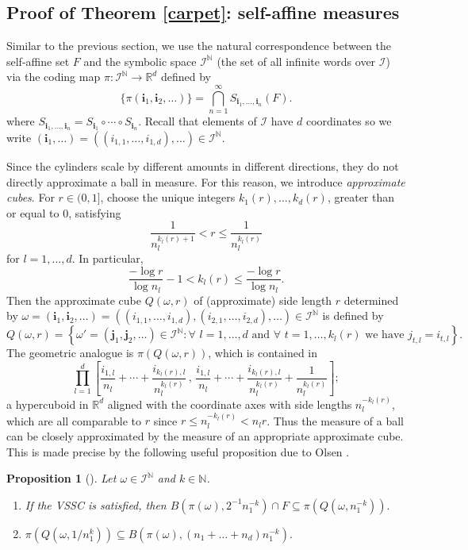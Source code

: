 \documentclass[12pt]{amsart}
\numberwithin{equation}{section}
\newtheorem{prop}[thm]{Proposition}
\renewcommand{\leq}{\leqslant}
\begin{document}
\subsection{Proof of Theorem \ref{carpet}: self-affine measures} \label{self-affine}



Similar to the previous section, we use the natural correspondence between the self-affine set $F$ and the symbolic space $\mathcal{I}^{\mathbb{N}}$ (the set of all infinite words over $\mathcal{I}$) via the coding map $\pi \colon \mathcal{I}^{\mathbb{N}} \rightarrow \mathbb{R}^d$ defined by 
\[
\{\pi(\textbf{i}_1, \textbf{i}_2, \ldots)\}=  \bigcap_{n=1}^\infty S_{\textbf{i}_1,\ldots, \textbf{i}_n}(F).
\]
where $ S_{\textbf{i}_1,\ldots, \textbf{i}_n} =  S_{\textbf{i}_1} \circ \cdots \circ S_{\textbf{i}_n}$.  Recall that elements of $\mathcal{I}$ have $d$ coordinates so we write $(\mathbf{i}_1,\ldots) = ((i_{1,1},\ldots, i_{1,d}),\ldots) \in \mathcal{I}^{\mathbb{N}} $.

Since the cylinders scale by different amounts in different directions, they do not directly approximate a ball in measure.  For this reason, we introduce \emph{approximate cubes}. For $r\in (0,1]$, choose the unique integers $k_1(r),\ldots,k_d(r)$, greater than or equal to 0, satisfying
\[
\frac{1}{n_l^{k_l(r)+1}}< r \leq \frac{1}{n_l^{k_l(r)}}
\]
for $l=1,\ldots,d$. In particular, 
\[
 \frac{-\log r}{\log n_l}-1 < k_l(r) \leq \frac{-\log r}{\log n_l}.
\]
Then the approximate cube $Q(\omega, r)$ of (approximate) side length $r$ determined by $\omega =\left( \textbf{i}_1, \textbf{i}_2 , \ldots \right) =\left( (i_{1,1}, \dots, i_{1,d}), (i_{2,1}, \dots, i_{2,d}) , \ldots \right)    \in \mathcal{I}^{\mathbb{N}}$ is defined by
\[
Q(\omega, r)=\left\{ \omega'=\left( \textbf{j}_1, \textbf{j}_2 , \ldots \right)\in \mathcal{I}^{\mathbb{N}} : \forall \, \,  l=1, \ldots, d \text{ and } \forall\, \, t= 1, \ldots, k_l(r) \text{ we have } j_{t,l}=i_{t,l} \right\}.
\]
The geometric analogue is $\pi\left(Q(\omega, r)\right)$, which is contained in
\[ 
\prod_{l=1}^d \left[\frac{i_{1,l}}{n_l}+\cdots+\frac{i_{k_l(r),l}}{n_l^{k_l(r)}} \, , \, \frac{i_{1,l}}{n_l}+\cdots+\frac{i_{k_l(r),l}}{n_l^{k_l(r)}}+\frac{1}{n_l^{k_l(r)}} \right];
\]
a hypercuboid in $\mathbb{R}^d$ aligned with the coordinate axes with side lengths $n_l^{-k_l(r)}$, which are all comparable to $r$ since $ r \leq n_l^{-k_l(r)} < n_l r$.  Thus the measure of a ball can be closely approximated by the measure of an appropriate approximate cube.  This is made precise by the following   useful proposition due to Olsen \cite[Proposition 6.2.1]{sponges}.
\begin{prop}[\cite{sponges}] \label{ballscubes}
Let $\omega \in \mathcal{I}^{\mathbb{N}}$ and $k \in \mathbb{N}$.
\begin{enumerate} 
\item If the VSSC is satisfied, then $B\left( \pi(\omega), 2^{-1}n_1^{-k}\right)\cap F \subseteq \pi \left(Q\left( \omega, n_1^{-k} \right) \right).$ 
\item  $\pi \left(Q\left( \omega, 1/n_1^k \right) \right) \subseteq B\left( \pi(\omega), (n_1+\dots+n_d)n_1^{-k}\right).$ 
\end{enumerate}
\end{prop}
\end{document}
